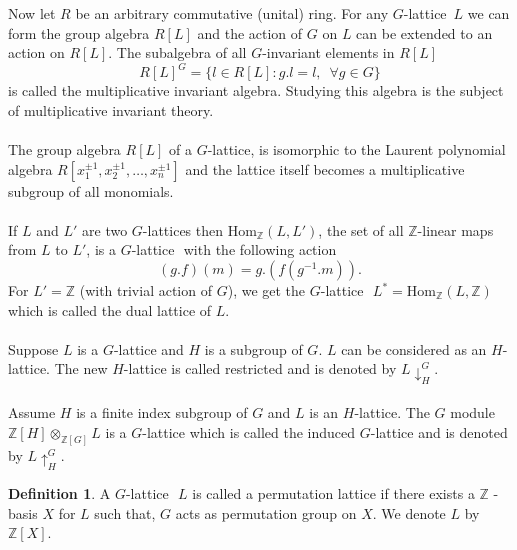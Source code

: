 \documentclass[a4paper, 14pt]{extarticle}
\theoremstyle{plain}
\newtheorem{lemma}[theorem]{Lemma}
\theoremstyle{definition}
\newtheorem{definition}[theorem]{Definition}
\newtheorem{example}[theorem]{Example}
\newcommand{\Z}{\ensuremath{\mathbb{Z}}}
\newcommand{\G}{G}
\newcommand{\glat}{$G$-lattice}
\begin{document}
Now let $R$ be an arbitrary commutative (unital) ring. For any \glat  \, $L$ we can form the group algebra $R[L]$ and the action of $G$ on $L$ can be extended to an action on $R[L]$. The subalgebra of all $G$-invariant elements in $R[L]$ $$ R[L]^ \G = \lbrace l \in R[L] : g.l = l, \,\,\, \forall g \in \G \rbrace$$ is called the multiplicative invariant algebra. Studying this algebra is the subject of multiplicative invariant theory. 
\\
\\
The group algebra $R[L]$ of a \glat , is isomorphic to the Laurent polynomial algebra \linebreak $R[x_1^{\pm 1}, x_2^{\pm 1}, \ldots , x_n^{\pm 1}] $ and the lattice itself becomes a multiplicative subgroup of all monomials.
\\
\\
If $L$ and $L'$ are two \glat  s then $\mathrm{Hom}_{\Z}(L,L')$, the set of all $\Z$-linear maps from $L$ to $L'$, is a \glat \,\, with the following action $$ (g.f)(m) = g.(f(g^{-1}.m)).$$
For $L'=\Z$ (with trivial action of $G$), we get the \glat \,\,  $L^* = \mathrm{Hom}_{\Z}(L,\Z)$ which is called the dual lattice of $L$.\\
\\Suppose $L$ is a $G$-lattice and $H$ is a subgroup of $G$. $L$ can be considered as an $H$-lattice. The new $H$-lattice is called restricted and is denoted by $L\downarrow^G_H$.\\
\\Assume $H$ is a finite index subgroup of $G$ and $L$ is an $H$-lattice. The $G$ module $\Z[H] \otimes_{\Z[G]} L$ is a $G$-lattice which is called the induced $G$-lattice and is denoted by $L\uparrow_H^G$. 
\begin{definition}
A \glat \,\, $L$ is called a permutation lattice if there exists a $\Z$ -basis $X$ for $L$ such that, $G$ acts as permutation group on $X$. We denote $L$ by $\Z[X]$.
\end{definition}
\end{document}
